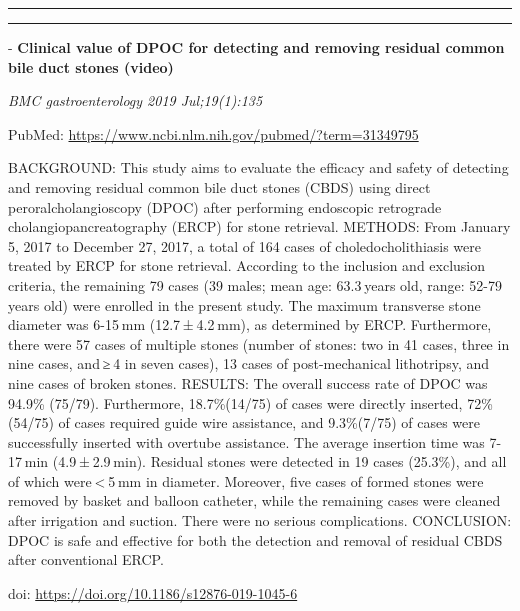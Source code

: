\documentclass[]{article}
\begin{document}
{}

{}

\begin{center}\rule{0.5\linewidth}{\linethickness}\end{center}

\begin{center}\rule{0.5\linewidth}{\linethickness}\end{center}

 - \textbf{Clinical value of DPOC for detecting and removing residual
common bile duct stones (video)}

\emph{BMC gastroenterology 2019 Jul;19(1):135}

PubMed: \url{https://www.ncbi.nlm.nih.gov/pubmed/?term=31349795}

BACKGROUND: This study aims to evaluate the efficacy and safety of
detecting and removing residual common bile duct stones (CBDS) using
direct peroralcholangioscopy (DPOC) after performing endoscopic
retrograde cholangiopancreatography (ERCP) for stone retrieval. METHODS:
From January 5, 2017 to December 27, 2017, a total of 164 cases of
choledocholithiasis were treated by ERCP for stone retrieval. According
to the inclusion and exclusion criteria, the remaining 79 cases (39
males; mean age: 63.3 years old, range: 52-79 years old) were enrolled
in the present study. The maximum transverse stone diameter was 6-15 mm
(12.7 ± 4.2 mm), as determined by ERCP. Furthermore, there were 57 cases
of multiple stones (number of stones: two in 41 cases, three in nine
cases, and ≥ 4 in seven cases), 13 cases of post-mechanical lithotripsy,
and nine cases of broken stones. RESULTS: The overall success rate of
DPOC was 94.9\% (75/79). Furthermore, 18.7\%(14/75) of cases were
directly inserted, 72\%(54/75) of cases required guide wire assistance,
and 9.3\%(7/75) of cases were successfully inserted with overtube
assistance. The average insertion time was 7-17 min (4.9 ± 2.9 min).
Residual stones were detected in 19 cases (25.3\%), and all of which
were \textless{} 5 mm in diameter. Moreover, five cases of formed stones
were removed by basket and balloon catheter, while the remaining cases
were cleaned after irrigation and suction. There were no serious
complications. CONCLUSION: DPOC is safe and effective for both the
detection and removal of residual CBDS after conventional ERCP.

doi: \url{https://doi.org/10.1186/s12876-019-1045-6}

{}

{}
\end{document}
